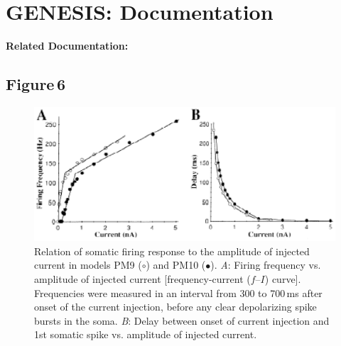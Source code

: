 \documentclass[12pt]{article}
\begin{document}
\section*{GENESIS: Documentation}

{\bf Related Documentation:}

\subsection*{Figure\,6}

\begin{figure}[h]
\centering
   \includegraphics[scale=1]{figures/Fig.1.6.eps}
   \caption{Relation of somatic firing response to the amplitude of injected current in models PM9 ($\circ$) and PM10 ($\bullet$). {\it A}: Firing frequency vs. amplitude of injected current [frequency-current ($f$--$I$) curve]. Frequencies were measured in an interval from 300 to 700\,ms after onset of the current injection, before any clear depolarizing spike bursts in the soma. {\it B}: Delay between onset of current injection and 1st somatic spike vs. amplitude of injected current.}
   \label{fig:DS1.6}
\end{figure}



\end{document}
